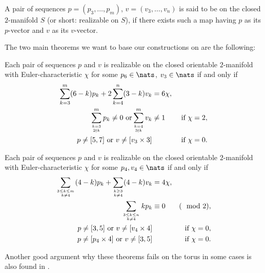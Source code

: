 \begin{definition}\label{def:realizable}
  A pair of sequences $p = (p_3, \dots, p_m)$, $v = (v_3, \dots, v_n)$ is said to be  on the closed $2$-manifold $S$ (or short: realizable on $S$), if there exists such a map having $p$ as its $p$-vector and $v$ as its $v$-vector.
\end{definition}

The two main theorems we want to base our constructions on are the following:

\begin{theorem} \label{thm:eberhard:extended:3}
  Each pair of sequences $p$ and $v$ is realizable on the closed orientable $2$-manifold with {\sc Euler}-characteristic $\chi$ for some $p_6 \in \nats$, $v_3 \in \nats$ if and only if
  \begin{align*}
    \sum_{k=3}^m (6-k)p_k + 2 \sum_{k=4}^n (3-k)v_k &= 6\chi, \\
    \sum_{k=3 \atop 2 \nmid k}^{m} p_k \neq 0 \text{ or} \sum_{k=4 \atop 3 \nmid k}^m v_k &\neq 1 &\text{ if } \chi = 2, \\
    p \neq [5, 7] \text{ or } v \neq [v_3 \times 3]  &&\text{ if } \chi = 0.
  \end{align*}
\end{theorem}

\begin{theorem} \label{thm:eberhard:extended:4}
  Each pair of sequences $p$ and $v$ is realizable on the closed orientable $2$-manifold with {\sc Euler}-characteristic $\chi$ for some $p_4, v_4 \in \nats$ if and only if
  \begin{align*}
    \sum_{3 \leq k \leq m \atop k \neq 4} (4-k)p_k + \sum_{k \geq 3 \atop k\neq 4} (4-k)v_k &= 4\chi, \\
    \sum_{3 \leq k \leq n \atop k \neq 4} k p_k &\equiv 0& (\mod 2), \\
    p \neq [3, 5] \text{ or } v \neq [v_4 \times 4] &&\text{ if } \chi = 0,\\
    p \neq [p_4 \times 4] \text{ or } v \neq [3, 5] &&\text{ if } \chi = 0.
  \end{align*}
\end{theorem}

Another good argument why these theorems fails on the torus in some cases is also found in \cite{izmestiev2013there}.